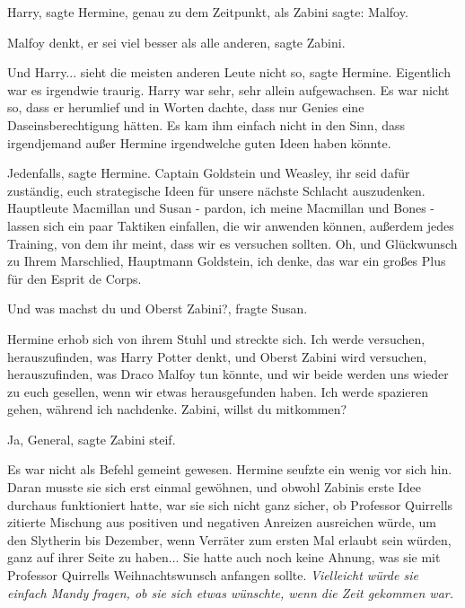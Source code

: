 \glqq{}Harry\grqq{}, sagte Hermine, genau zu dem Zeitpunkt, als Zabini sagte:
\glqq{}Malfoy.\grqq{}

\glqq{}Malfoy denkt, er sei viel besser als alle anderen\grqq{}, sagte Zabini.

\glqq{}Und Harry... sieht die meisten anderen Leute nicht so\grqq{}, sagte
Hermine. Eigentlich war es irgendwie traurig. Harry war sehr, sehr allein
aufgewachsen. Es war nicht so, dass er herumlief und in Worten dachte, dass nur
Genies eine Daseinsberechtigung hätten. Es kam ihm einfach nicht in den Sinn,
dass irgendjemand außer Hermine irgendwelche guten Ideen haben könnte.

\glqq{}Jedenfalls\grqq{}, sagte Hermine. \glqq{}Captain Goldstein und Weasley, ihr
seid dafür zuständig, euch strategische Ideen für unsere nächste Schlacht
auszudenken. Hauptleute Macmillan und Susan - pardon, ich meine Macmillan und
Bones - lassen sich ein paar Taktiken einfallen, die wir anwenden können,
außerdem jedes Training, von dem ihr meint, dass wir es versuchen sollten. Oh,
und Glückwunsch zu Ihrem Marschlied, Hauptmann Goldstein, ich denke, das war ein
großes Plus für den Esprit de Corps.\grqq{}

\glqq{}Und was machst du und Oberst Zabini?\grqq{}, fragte Susan.

Hermine erhob sich von ihrem Stuhl und streckte sich. \glqq{}Ich werde versuchen,
herauszufinden, was Harry Potter denkt, und Oberst Zabini wird versuchen,
herauszufinden, was Draco Malfoy tun könnte, und wir beide werden uns wieder zu
euch gesellen, wenn wir etwas herausgefunden haben. Ich werde spazieren gehen,
während ich nachdenke. Zabini, willst du mitkommen?\grqq{}

\glqq{}Ja, General\grqq{}, sagte Zabini steif.

Es war nicht als Befehl gemeint gewesen. Hermine seufzte ein wenig vor sich hin.
Daran musste sie sich erst einmal gewöhnen, und obwohl Zabinis erste Idee
durchaus funktioniert hatte, war sie sich nicht ganz sicher, ob Professor
Quirrells zitierte Mischung aus positiven und negativen Anreizen ausreichen
würde, um den Slytherin bis Dezember, wenn Verräter zum ersten Mal erlaubt sein
würden, ganz auf ihrer Seite zu haben... Sie hatte auch noch keine Ahnung, was
sie mit Professor Quirrells Weihnachtswunsch anfangen sollte. \emph{ Vielleicht
würde sie einfach Mandy fragen, ob sie sich etwas wünschte, wenn die Zeit
gekommen war.}


